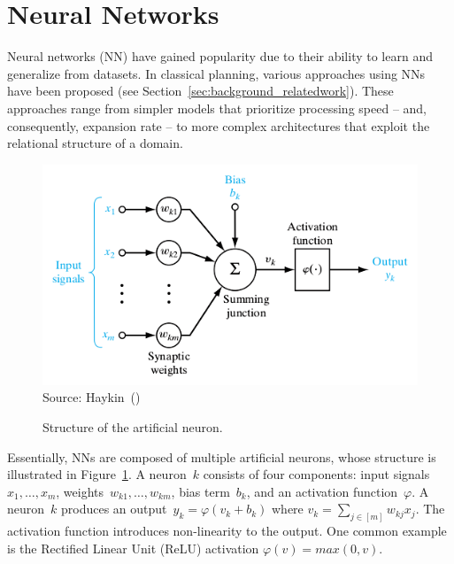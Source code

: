 \section{Neural Networks}
\label{sec:background_neuralnetworks}

Neural networks (NN) have gained popularity due to their ability to learn and generalize from datasets. In classical planning, various approaches using NNs have been proposed (see Section~\ref{sec:background_relatedwork}). These approaches range from simpler models that prioritize processing speed -- and, consequently, expansion rate -- to more complex architectures that exploit the relational structure of a domain.

\begin{figure}[ht]
    \caption{Structure of the artificial neuron.}
    \label{fig:neuron}
    \centering
    \includegraphics[width=0.8\linewidth]{figures/neuron.png} \\
    Source: Haykin~(\citeyear{Haykin/2009})
\end{figure}

Essentially, NNs are composed of multiple artificial neurons, whose structure is illustrated in Figure~\ref{fig:neuron}. A neuron~$k$ consists of four components: input signals~$x_1,\ldots,x_m$, weights~$w_{k1},\ldots,w_{km}$, bias term~$b_k$, and an activation function~$\varphi$. A neuron~$k$ produces an output~$y_k = \varphi(v_k + b_k)$ where $v_k = \sum_{j \in [m]} w_{kj} x_j$. The activation function introduces non-linearity to the output. One common example is the Rectified Linear Unit (ReLU) activation $\varphi(v) = max(0,v)$.


